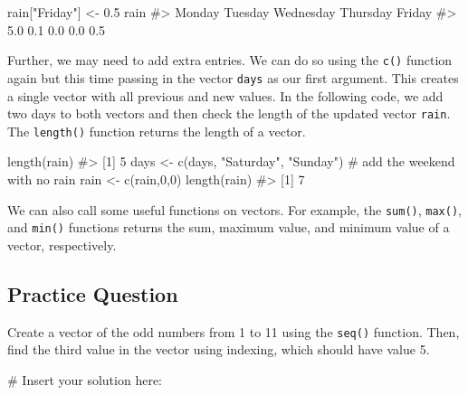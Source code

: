 \documentclass[
  letterpaper,
]{latex/krantz}
\makeatletter
\newenvironment{Shaded}{\begin{snugshade}}{\end{snugshade}}
\newcommand{\CommentTok}[1]{\textcolor[rgb]{0.37,0.37,0.37}{#1}}
\newcommand{\DecValTok}[1]{\textcolor[rgb]{0.68,0.00,0.00}{#1}}
\newcommand{\FloatTok}[1]{\textcolor[rgb]{0.68,0.00,0.00}{#1}}
\newcommand{\FunctionTok}[1]{\textcolor[rgb]{0.28,0.35,0.67}{#1}}
\newcommand{\NormalTok}[1]{\textcolor[rgb]{0.00,0.23,0.31}{#1}}
\newcommand{\OtherTok}[1]{\textcolor[rgb]{0.00,0.23,0.31}{#1}}
\newcommand{\StringTok}[1]{\textcolor[rgb]{0.13,0.47,0.30}{#1}}
\newenvironment{kframe}{%
\medskip{}
\setlength{\fboxsep}{.8em}
 \def\at@end@of@kframe{}%
 \ifinner\ifhmode%
  \def\at@end@of@kframe{\end{minipage}}%
  \begin{minipage}{\columnwidth}%
 \fi\fi%
 \def\FrameCommand##1{\hskip\@totalleftmargin \hskip-\fboxsep
 \colorbox{shadecolor}{##1}\hskip-\fboxsep
     \hskip-\linewidth \hskip-\@totalleftmargin \hskip\columnwidth}%
 \MakeFramed {\advance\hsize-\width
   \@totalleftmargin\z@ \linewidth\hsize
   \@setminipage}}%
 {\par\unskip\endMakeFramed%
 \at@end@of@kframe}
\renewenvironment{Shaded}{\begin{kframe}}{\end{kframe}}
\makeatother
\begin{document}
\begin{Shaded}
\begin{Highlighting}[]
\NormalTok{rain[}\StringTok{"Friday"}\NormalTok{] }\OtherTok{\textless{}{-}} \FloatTok{0.5}
\NormalTok{rain}
\CommentTok{\#\textgreater{}    Monday   Tuesday Wednesday  Thursday    Friday }
\CommentTok{\#\textgreater{}       5.0       0.1       0.0       0.0       0.5}
\end{Highlighting}
\end{Shaded}

Further, we may need to add extra entries. We can do so using the
\texttt{c()} function again but this time passing in the vector
\texttt{days} as our first argument. This creates a single vector with
all previous and new values. In the following code, we add two days to
both vectors and then check the length of the updated vector
\texttt{rain}. The
\texttt{length()} function
returns the length of a vector.

\begin{Shaded}
\begin{Highlighting}[]
\FunctionTok{length}\NormalTok{(rain)}
\CommentTok{\#\textgreater{} [1] 5}
\NormalTok{days }\OtherTok{\textless{}{-}} \FunctionTok{c}\NormalTok{(days, }\StringTok{"Saturday"}\NormalTok{, }\StringTok{"Sunday"}\NormalTok{) }\CommentTok{\# add the weekend with no rain}
\NormalTok{rain }\OtherTok{\textless{}{-}} \FunctionTok{c}\NormalTok{(rain,}\DecValTok{0}\NormalTok{,}\DecValTok{0}\NormalTok{)}
\FunctionTok{length}\NormalTok{(rain)}
\CommentTok{\#\textgreater{} [1] 7}
\end{Highlighting}
\end{Shaded}

We can also call some useful functions on vectors. For example, the
\texttt{sum()}, \texttt{max()},
and \texttt{min()} functions
returns the sum, maximum value, and minimum value of a vector,
respectively.

\subsection{Practice Question}\label{practice-question}

Create a vector of the odd numbers from 1 to 11 using the \texttt{seq()}
function. Then, find the third value in the vector using indexing, which
should have value 5.

\begin{Shaded}
\begin{Highlighting}[]
\CommentTok{\# Insert your solution here:}
\end{Highlighting}
\end{Shaded}
\end{document}
